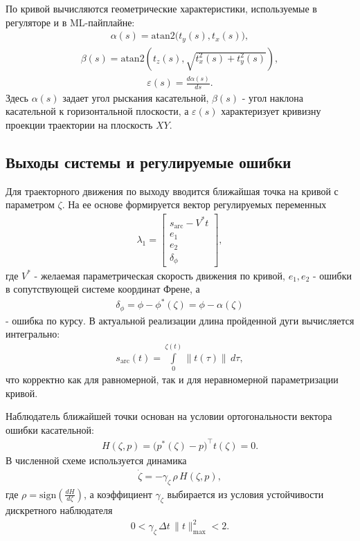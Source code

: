 По кривой вычисляются геометрические характеристики, используемые в регуляторе и в ML-пайплайне:
\begin{gather}
    \alpha(s) = \mathrm{atan2}\bigl(t_y(s), t_x(s)\bigr),
\end{gather}
\begin{gather}
    \beta(s) = \mathrm{atan2}\left(t_z(s), \sqrt{t_x^2(s) + t_y^2(s)}\right),
\end{gather}
\begin{gather}
    \varepsilon(s) = \frac{d \alpha(s)}{d s}.
\end{gather}
Здесь $\alpha(s)$ задает угол рыскания касательной, $\beta(s)$ - угол наклона касательной к горизонтальной плоскости, а $\varepsilon(s)$ характеризует кривизну проекции траектории на плоскость $XY$.

\subsection{Выходы системы и регулируемые ошибки}

Для траекторного движения по выходу вводится ближайшая точка на кривой с параметром $\zeta$. На ее основе формируется вектор регулируемых переменных
\begin{gather}
    \lambda_1 =
    \begin{bmatrix}
        s_{\mathrm{arc}} - V^{\ast} t \\
        e_1 \\
        e_2 \\
        \delta_{\phi}
    \end{bmatrix},
\end{gather}
где $V^{\ast}$ - желаемая параметрическая скорость движения по кривой, $e_1,e_2$ - ошибки в сопутствующей системе координат Френе, а
\begin{gather}
    \delta_{\phi} = \phi - \phi^{\ast}(\zeta) = \phi - \alpha(\zeta)
\end{gather}
- ошибка по курсу. В актуальной реализации длина пройденной дуги вычисляется интегрально:
\begin{gather}
    s_{\mathrm{arc}}(t) = \int\limits_{0}^{\zeta(t)} \|t(\tau)\|\,d\tau,
\end{gather}
что корректно как для равномерной, так и для неравномерной параметризации кривой.

Наблюдатель ближайшей точки основан на условии ортогональности вектора ошибки касательной:
\begin{gather}
    H(\zeta,p) = \bigl(p^{\ast}(\zeta) - p\bigr)^{\top} t(\zeta) = 0.
\end{gather}
В численной схеме используется динамика
\begin{gather}
    \dot{\zeta} = -\gamma_{\zeta} \,\rho \, H(\zeta,p),
\end{gather}
где $\rho = \mathrm{sign}\left(\frac{dH}{d\zeta}\right)$, а коэффициент $\gamma_{\zeta}$ выбирается из условия устойчивости дискретного наблюдателя
\begin{gather}
    0 < \gamma_{\zeta} \, \Delta t \, \|t\|_{\max}^{2} < 2.
\end{gather}


